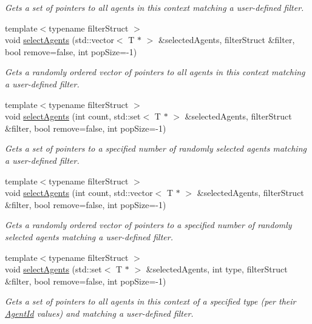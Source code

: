 \begin{DoxyCompactItemize}
\begin{DoxyCompactList}\small\item\em Gets a set of pointers to all agents in this context matching a user-\/defined filter. \end{DoxyCompactList}\item 
{\footnotesize template$<$typename filter\-Struct $>$ }\\void \hyperlink{classrepast_1_1_context_a5011ce09dc44040c235b176261defcf3}{select\-Agents} (std\-::vector$<$ T $\ast$ $>$ \&selected\-Agents, filter\-Struct \&filter, bool remove=false, int pop\-Size=-\/1)
\begin{DoxyCompactList}\small\item\em Gets a randomly ordered vector of pointers to all agents in this context matching a user-\/defined filter. \end{DoxyCompactList}\item 
{\footnotesize template$<$typename filter\-Struct $>$ }\\void \hyperlink{classrepast_1_1_context_a10218ffcf74884be4e12c49a26106878}{select\-Agents} (int count, std\-::set$<$ T $\ast$ $>$ \&selected\-Agents, filter\-Struct \&filter, bool remove=false, int pop\-Size=-\/1)
\begin{DoxyCompactList}\small\item\em Gets a set of pointers to a specified number of randomly selected agents matching a user-\/defined filter. \end{DoxyCompactList}\item 
{\footnotesize template$<$typename filter\-Struct $>$ }\\void \hyperlink{classrepast_1_1_context_a41673cd1e0623849d505884afaaf2581}{select\-Agents} (int count, std\-::vector$<$ T $\ast$ $>$ \&selected\-Agents, filter\-Struct \&filter, bool remove=false, int pop\-Size=-\/1)
\begin{DoxyCompactList}\small\item\em Gets a randomly ordered vector of pointers to a specified number of randomly selected agents matching a user-\/defined filter. \end{DoxyCompactList}\item 
{\footnotesize template$<$typename filter\-Struct $>$ }\\void \hyperlink{classrepast_1_1_context_a2d678fd5e8a320db144d17fb863ee91a}{select\-Agents} (std\-::set$<$ T $\ast$ $>$ \&selected\-Agents, int type, filter\-Struct \&filter, bool remove=false, int pop\-Size=-\/1)
\begin{DoxyCompactList}\small\item\em Gets a set of pointers to all agents in this context of a specified type (per their \hyperlink{classrepast_1_1_agent_id}{Agent\-Id} values) and matching a user-\/defined filter. \end{DoxyCompactList}\item 

\end{DoxyCompactItemize}
